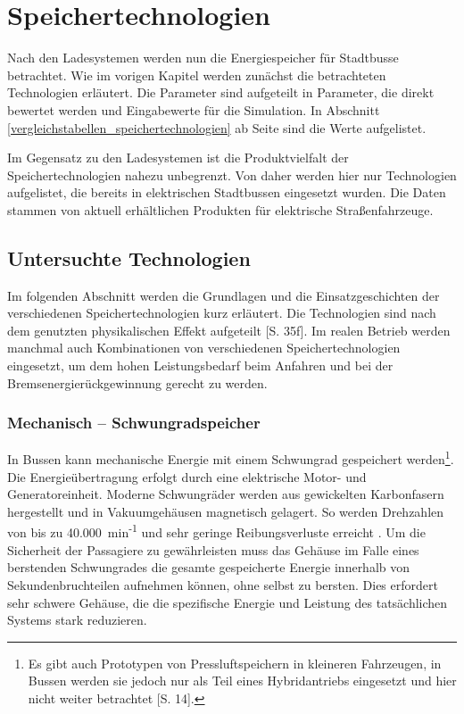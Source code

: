 \chapter{Speichertechnologien}

Nach den Ladesystemen werden nun die Energiespeicher für Stadtbusse betrachtet. Wie im vorigen Kapitel werden zunächst die betrachteten Technologien erläutert. Die Parameter sind aufgeteilt in Parameter, die direkt bewertet werden und Eingabewerte für die Simulation. In Abschnitt \ref{vergleichstabellen_speichertechnologien} ab Seite \pageref{vergleichstabellen_speichertechnologien} sind die Werte aufgelistet.

Im Gegensatz zu den Ladesystemen ist die Produktvielfalt der Speichertechnologien nahezu unbegrenzt. Von daher werden hier nur Technologien aufgelistet, die bereits in elektrischen Stadtbussen eingesetzt wurden. Die Daten stammen von aktuell erhältlichen Produkten für elektrische Straßenfahrzeuge.

\section{Untersuchte Technologien}
Im folgenden Abschnitt werden die Grundlagen und die Einsatzgeschichten der verschiedenen Speichertechnologien kurz erläutert. Die Technologien sind nach dem genutzten physikalischen Effekt aufgeteilt \cite{Sterner:2014}[S. 35f]. Im realen Betrieb werden manchmal auch Kombinationen von verschiedenen Speichertechnologien eingesetzt, um dem hohen Leistungsbedarf beim Anfahren und bei der Bremsenergierückgewinnung gerecht zu werden.

\subsection{Mechanisch – Schwungradspeicher}
In Bussen kann mechanische Energie mit einem Schwungrad gespeichert werden\footnote{Es gibt auch Prototypen von Pressluftspeichern in kleineren Fahrzeugen, in Bussen werden sie jedoch nur als Teil eines Hybridantriebs eingesetzt und hier nicht weiter betrachtet \cite{Sebastian-Naumann:2014}[S. 14].}. Die Energieübertragung erfolgt durch eine elektrische Motor- und Generatoreinheit. Moderne Schwungräder werden aus gewickelten Karbonfasern hergestellt und in Vakuumgehäusen magnetisch gelagert. So werden Drehzahlen von bis zu 40.000~min\textsuperscript{-1} und sehr geringe Reibungsverluste erreicht \cite{993788}. Um die Sicherheit der Passagiere zu gewährleisten muss das Gehäuse im Falle eines berstenden Schwungrades die gesamte gespeicherte Energie innerhalb von Sekundenbruchteilen aufnehmen können, ohne selbst zu bersten. Dies erfordert sehr schwere Gehäuse, die die spezifische Energie und Leistung des tatsächlichen Systems stark reduzieren.

